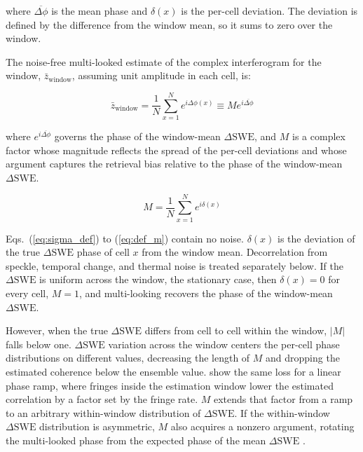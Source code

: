 \documentclass[tc, manuscript]{copernicus}
\begin{document}
\noindent where $\overline{\Delta\phi}$ is the mean phase and  $\delta(x)$ is the per-cell deviation. The deviation is defined by the difference from the window mean, so it sums to zero over the window.

The noise-free multi-looked estimate of the complex interferogram for the window, $\bar{z}_{\mathrm{window}}$, assuming unit amplitude in each cell, is:

\begin{equation}\label{eq:z_window}
    \bar{z}_{\mathrm{window}}
      = \frac{1}{N} \sum_{x=1}^{N} e^{i\Delta\phi(x)}
      \equiv M e^{i\overline{\Delta\phi}}
\end{equation}

\noindent where $e^{i\overline{\Delta\phi}}$ governs the phase of the window-mean $\Delta\mathrm{SWE}$, and $M$ is a complex factor whose magnitude reflects the spread of the per-cell deviations and whose argument captures the retrieval bias relative to the phase of the window-mean $\Delta\mathrm{SWE}$.

\begin{equation}\label{eq:def_m}
    M = \frac{1}{N} \sum_{x=1}^{N} e^{i\delta(x)}
\end{equation}

Eqs.~(\ref{eq:sigma_def}) to (\ref{eq:def_m}) contain no noise. $\delta(x)$ is the deviation of the true $\Delta\mathrm{SWE}$ phase of cell $x$ from the window mean. Decorrelation from speckle, temporal change, and thermal noise is treated separately below. If the $\Delta\mathrm{SWE}$ is uniform across the window, the stationary case, then $\delta(x) = 0$ for every cell, $M = 1$, and multi-looking recovers the phase of the window-mean $\Delta\mathrm{SWE}$.

However, when the true $\Delta\mathrm{SWE}$ differs from cell to cell within the window, $|M|$ falls below one. $\Delta\mathrm{SWE}$ variation across the window centers the per-cell phase distributions on different values, decreasing the length of $M$ and dropping the estimated coherence below the ensemble value. \citet{zebker2005accurate-421} show the same loss for a linear phase ramp, where fringes inside the estimation window lower the estimated correlation by a factor set by the fringe rate. $M$ extends that factor from a ramp to an arbitrary within-window distribution of $\Delta\mathrm{SWE}$. If the within-window $\Delta\mathrm{SWE}$ distribution is asymmetric, $M$ also acquires a nonzero argument, rotating the multi-looked phase from the expected phase of the mean $\Delta\mathrm{SWE}$ \citep{fischer1993}.
\end{document}
